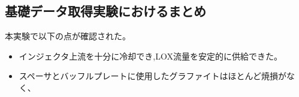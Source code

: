 \subsection{基礎データ取得実験におけるまとめ}
本実験で以下の点が確認された。
\begin{itemize}
\item インジェクタ上流を十分に冷却でき,LOX流量を安定的に供給できた。
\item スペーサとバッフルプレートに使用したグラファイトはほとんど焼損がなく、
\end{itemize}
